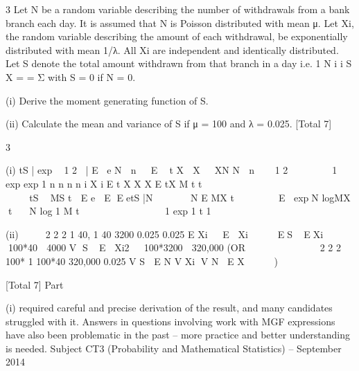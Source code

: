 \documentclass[a4paper,12pt]{article}
\begin{document}
3 Let N be a random variable describing the number of withdrawals from a bank branch
each day. It is assumed that N is Poisson distributed with mean μ. Let Xi, the random
variable describing the amount of each withdrawal, be exponentially distributed with
mean 1/λ. All Xi are independent and identically distributed. Let S denote the total
amount withdrawn from that branch in a day i.e.
1
N
i
i
S X
=
  = Σ
with S = 0 if N = 0.
\item (i) Derive the moment generating function of S. 
\item (ii) Calculate the mean and variance of S if μ = 100 and λ = 0.025. 
[Total 7]


3 \item (i) tS | exp  1 2 |
  E e N  n  E  t X  X  XN N  n
  1 2      
1
exp exp 1
n n n
n i X
i
E t X X X E tX M t t


                      
   tS 
MS t  E e
 E EetS |N
 
  N
E MX t   
 
 E expN logMX t 
N log 1
M t
           
1
exp 1 t 1               

\item (ii)  
 
2 2
2
1 40, 1 40 3200
0.025 0.025
E Xi   E Xi    
ES EXi  100*40  4000
V S E Xi2  100*3200  320,000
(OR
           
   
  2 2
  2
  100* 1 100*40 320,000
  0.025
  V S  E N V Xi V N E X     )

[Total 7]
Part \item (i) required careful and precise derivation of the result, and many candidates struggled
with it. Answers in questions involving work with MGF expressions have also been
problematic in the past – more practice and better understanding is needed.
Subject CT3 (Probability and Mathematical Statistics) – September 2014 
\end{document}
